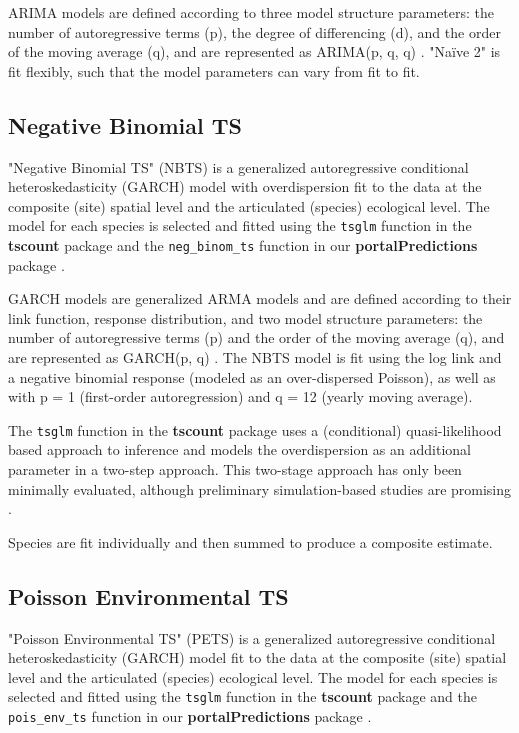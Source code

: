 \documentclass{article}
\def\code#1{\texttt{#1}}
\begin{document}
ARIMA models are defined according to three model structure parameters: the number of autoregressive terms (p), the degree of differencing (d), and the order of the moving average (q), and are represented as ARIMA(p, q, q) \citep{Box1970}. "Na\"{i}ve 2" is fit flexibly, such that the model parameters can vary from fit to fit.

\subsection{Negative Binomial TS}
\label{subsec:neg_binom_ts}

"Negative Binomial TS" (NBTS) is a generalized autoregressive conditional heteroskedasticity (GARCH) model with overdispersion fit to the data at the composite (site) spatial level and the articulated (species) ecological level. The model for each species is selected and fitted using the \code{tsglm} function in the \textbf{tscount} package \citep{Liboschik2017a} and the \code{neg\_binom\_ts} function in our \textbf{portalPredictions} package \citep{PortalPredictions}.

GARCH models are generalized ARMA models and are defined according to their link function, response distribution, and two model structure parameters: the number of autoregressive terms (p) and the order of the moving average (q), and are represented as GARCH(p, q) \citep{Liboschik2017a}. The NBTS model is fit using the log link and a negative binomial response (modeled as an over-dispersed Poisson), as well as with p = 1 (first-order autoregression) and q = 12 (yearly moving average).

The \code{tsglm} function in the \textbf{tscount} package \citep{Liboschik2017a} uses a (conditional) quasi-likelihood based approach to inference and models the overdispersion as an additional parameter in a two-step approach. This two-stage approach has only been minimally evaluated, although preliminary simulation-based studies are promising \citep{Liboschik2017b}.    

Species are fit individually and then summed to produce a composite estimate. 

\subsection{Poisson Environmental TS}
\label{subsec:pois_env_ts}

"Poisson Environmental TS" (PETS) is a generalized autoregressive conditional heteroskedasticity (GARCH) model fit to the data at the composite (site) spatial level and the articulated (species) ecological level. The model for each species is selected and fitted using the \code{tsglm} function in the \textbf{tscount} package \citep{Liboschik2017a} and the \code{pois\_env\_ts} function in our \textbf{portalPredictions} package \citep{PortalPredictions}.
\end{document}
